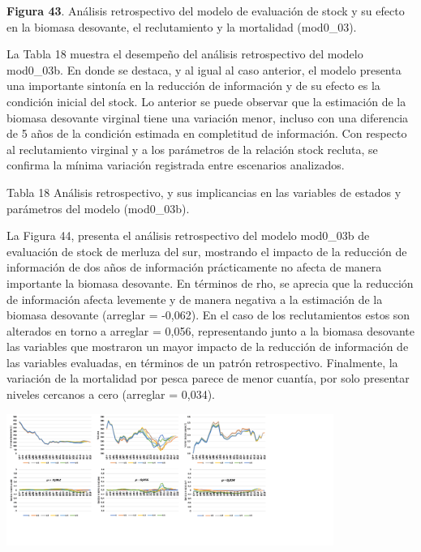 \documentclass[
  spanish,
]{article}
\begin{document}
\small \textbf{Figura 43}. Análisis retrospectivo del modelo de
evaluación de stock y su efecto en la biomasa desovante, el
reclutamiento y la mortalidad (mod0\_03). \vspace{0.5cm} \normalsize

La Tabla 18 muestra el desempeño del análisis retrospectivo del modelo
mod0\_03b. En donde se destaca, y al igual al caso anterior, el modelo
presenta una importante sintonía en la reducción de información y de su
efecto es la condición inicial del stock. Lo anterior se puede observar
que la estimación de la biomasa desovante virginal tiene una variación
menor, incluso con una diferencia de 5 años de la condición estimada en
completitud de información. Con respecto al reclutamiento virginal y a
los parámetros de la relación stock recluta, se confirma la mínima
variación registrada entre escenarios analizados.

Tabla 18 Análisis retrospectivo, y sus implicancias en las variables de
estados y parámetros del modelo (mod0\_03b).

La Figura 44, presenta el análisis retrospectivo del modelo mod0\_03b de
evaluación de stock de merluza del sur, mostrando el impacto de la
reducción de información de dos años de información prácticamente no
afecta de manera importante la biomasa desovante. En términos de rho, se
aprecia que la reducción de información afecta levemente y de manera
negativa a la estimación de la biomasa desovante (arreglar = -0,062). En
el caso de los reclutamientos estos son alterados en torno a arreglar =
0,056, representando junto a la biomasa desovante las variables que
mostraron un mayor impacto de la reducción de información de las
variables evaluadas, en términos de un patrón retrospectivo. Finalmente,
la variación de la mortalidad por pesca parece de menor cuantía, por
solo presentar niveles cercanos a cero (arreglar = 0,034).

\begin{center}
\includegraphics[width=0.8\textwidth]{Figuras/Figura_44.png}
\end{center}
\end{document}
